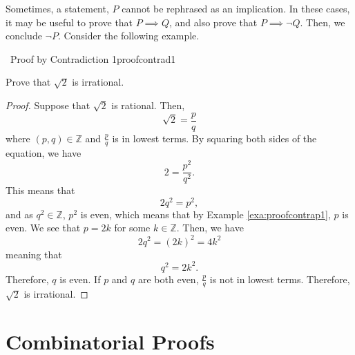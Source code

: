     Sometimes, a statement, \(P\) cannot be rephrased as an implication. In these cases, it may be useful to prove that \(P\implies Q\), and also prove that \(P\implies \neg Q\). Then, we conclude \(\neg P\). Consider the following example.
    \begin{example}{\Difficulty\,\Difficulty\,\,Proof by Contradiction 1}{proofcontrad1}
    
        Prove that \(\sqrt{2}\) is irrational.
        
        \begin{proof}
            Suppose that \(\sqrt{2}\) is rational. Then,
            \begin{equation*}
                \sqrt{2}=\frac{p}{q}
            \end{equation*}
            where \((p,q)\in\mathbb{Z}\) and \(\frac{p}{q}\) is in lowest terms. By squaring both sides of the equation, we have
            \begin{equation*}
                2=\frac{p^2}{q^2}.
            \end{equation*}
            This means that
            \begin{equation*}
                2q^2=p^2,
            \end{equation*}
            and as \(q^2\in\mathbb{Z}\), \(p^2\) is even, which means that by Example \ref{exa:proofcontrap1}, \(p\) is even. We see that \(p=2k\) for some \(k\in\mathbb{Z}\). Then, we have
            \begin{equation*}
                2q^2=(2k)^2=4k^2
            \end{equation*}
            meaning that
            \begin{equation*}
                q^2=2k^2.
            \end{equation*}
            Therefore, \(q\) is even. If \(p\) and \(q\) are both even, \(\frac{p}{q}\) is not in lowest terms. Therefore, \(\sqrt{2}\) is irrational.
        \end{proof}
    
    \end{example}

\section{Combinatorial Proofs}
    

